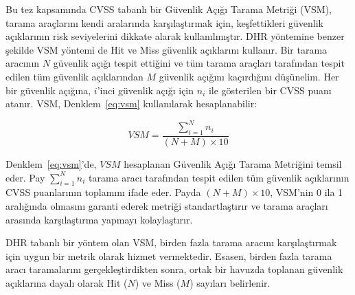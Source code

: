 Bu tez kapsamında CVSS tabanlı bir Güvenlik Açığı Tarama Metriği (VSM), tarama araçlarını kendi aralarında karşılaştırmak için, keşfettikleri güvenlik açıklarının risk seviyelerini dikkate alarak kullanılmıştır. DHR yöntemine benzer şekilde VSM yöntemi de Hit ve Miss güvenlik açıklarını kullanır. Bir tarama aracının $N$ güvenlik açığı tespit ettiğini ve tüm tarama araçları tarafından tespit edilen tüm güvenlik açıklarından $M$ güvenlik açığını kaçırdığını düşünelim. Her bir güvenlik açığına, $i$'inci güvenlik açığı için $n_i$ ile gösterilen bir CVSS puanı atanır. VSM, Denklem~\ref{eq:vsm} kullanılarak hesaplanabilir:

\begin{equation} \label{eq:vsm}
    VSM = \frac{\sum_{i=1}^{N} n_i}{(N+M) \times 10}
\end{equation}

Denklem~\ref{eq:vsm}'de, $VSM$ hesaplanan Güvenlik Açığı Tarama Metriğini temsil eder. Pay $\sum_{i=1}^{N} n_i$ tarama aracı tarafından tespit edilen tüm güvenlik açıklarının CVSS puanlarının toplamını ifade eder. Payda $(N+M)\times 10$, VSM'nin 0 ila 1 aralığında olmasını garanti ederek metriği standartlaştırır ve tarama araçları arasında karşılaştırma yapmayı kolaylaştırır.

DHR tabanlı bir yöntem olan VSM, birden fazla tarama aracını karşılaştırmak için uygun bir metrik olarak hizmet vermektedir. Esasen, birden fazla tarama aracı taramalarını gerçekleştirdikten sonra, ortak bir havuzda toplanan güvenlik açıklarına dayalı olarak Hit ($N$) ve Miss ($M$) sayıları belirlenir.

